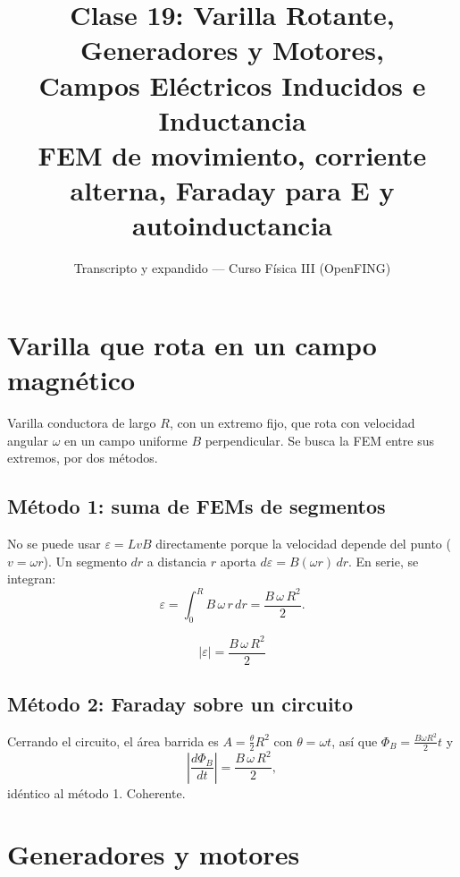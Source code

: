 \documentclass[12pt,a4paper]{article}
\title{\textbf{Clase 19: Varilla Rotante, Generadores y Motores, \\
        Campos Eléctricos Inducidos e Inductancia}\\[0.3em]
        \large{FEM de movimiento, corriente alterna, Faraday para $\mathbf{E}$
              y autoinductancia}}
\author{Transcripto y expandido --- Curso Física III (OpenFING)}
\date{}
\begin{document}
\maketitle
\thispagestyle{empty}
\newpage

\tableofcontents
\newpage

\section{Varilla que rota en un campo magnético}

Varilla conductora de largo $R$, con un extremo fijo, que rota con velocidad
angular $\omega$ en un campo uniforme $B$ perpendicular. Se busca la FEM entre
sus extremos, por dos métodos.

\subsection{Método 1: suma de FEMs de segmentos}

No se puede usar $\varepsilon = LvB$ directamente porque la velocidad depende
del punto ($v = \omega r$). Un segmento $dr$ a distancia $r$ aporta
$d\varepsilon = B(\omega r)\,dr$. En serie, se integran:
\[
\varepsilon = \int_0^{R} B\,\omega\, r\, dr = \frac{B\,\omega\,R^2}{2}.
\]

\begin{keybox}
  \[
  \boxed{|\varepsilon| = \frac{B\,\omega\,R^2}{2}}
  \]
\end{keybox}

\subsection{Método 2: Faraday sobre un circuito}

Cerrando el circuito, el área barrida es $A = \tfrac{\theta}{2}R^2$ con
$\theta = \omega t$, así que $\Phi_B = \tfrac{B\omega R^2}{2}t$ y
\[
\left|\frac{d\Phi_B}{dt}\right| = \frac{B\,\omega\,R^2}{2},
\]
idéntico al método 1. Coherente.

\section{Generadores y motores}
\end{document}
